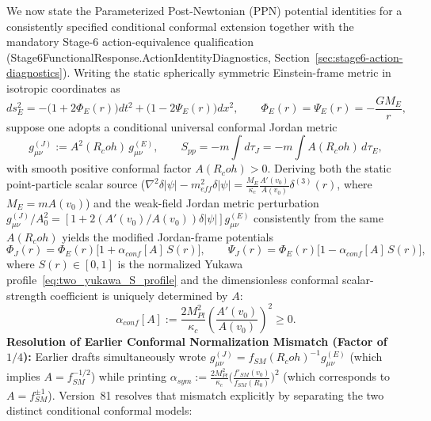 \documentclass[american,11pt,letterpaper]{article}
\newcommand{\Rcoh}{R_{\mathrm{coh}}}
\def\mathbf#1{#1}%
\def\mathrm#1{#1}%
\def\texttt#1{#1}%
\def\emph#1{#1}%
\def\Rcoh{R_coh}%
\begin{document}
We now state the Parameterized Post-Newtonian (PPN) potential identities for a \emph{consistently specified conditional conformal extension} together with the mandatory Stage-6 action-equivalence qualification (\texttt{Stage6FunctionalResponse.\allowbreak{}ActionIdentityDiagnostics}, Section~\ref{sec:stage6-action-diagnostics}). Writing the static spherically symmetric Einstein-frame metric in isotropic coordinates as
\[
ds_E^2 = -\bigl(1 + 2\Phi_E(r)\bigr)dt^2 + \bigl(1 - 2\Psi_E(r)\bigr)d\mathbf{x}^2,
\qquad
\Phi_E(r) = \Psi_E(r) = -\frac{G M_E}{r},
\]
suppose one adopts a conditional universal conformal Jordan metric
\begin{equation}
g_{\mu\nu}^{(J)} := A^2(\Rcoh)\,g_{\mu\nu}^{(E)},
\qquad
S_{\mathrm{pp}} = -m\int d\tau_J = -m\int A(\Rcoh)\,d\tau_E,
\label{eq:conformal_metric_general_A}
\end{equation}
with smooth positive conformal factor $A(\Rcoh) > 0$. Deriving \emph{both} the static point-particle scalar source ($\nabla^2\delta|\psi| - m_{\mathrm{eff}}^2\delta|\psi| = \frac{M_E}{\kappa_c}\frac{A'(v_0)}{A(v_0)}\delta^{(3)}(\mathbf{r})$, where $M_E = m A(v_0)$) \emph{and} the weak-field Jordan metric perturbation $g_{\mu\nu}^{(J)}/A_0^2 = [1 + 2(A'(v_0)/A(v_0))\delta|\psi|]g_{\mu\nu}^{(E)}$ consistently from the same $A(\Rcoh)$ yields the modified Jordan-frame potentials
\begin{equation}
\Phi_J(r) = \Phi_E(r)\bigl[1 + \alpha_{\mathrm{conf}}[A]\,S(r)\bigr],
\qquad
\Psi_J(r) = \Phi_E(r)\bigl[1 - \alpha_{\mathrm{conf}}[A]\,S(r)\bigr],
\label{eq:jordan_potentials_exact}
\end{equation}
where $S(r) \in [0,1]$ is the normalized Yukawa profile~\eqref{eq:two_yukawa_S_profile} and the dimensionless conformal scalar-strength coefficient is uniquely determined by $A$:
\begin{equation}
\alpha_{\mathrm{conf}}[A]
:= \frac{2 M_{\mathrm{Pl}}^2}{\kappa_c}\left(\frac{A'(v_0)}{A(v_0)}\right)^2 \ge 0.
\label{eq:alpha_conf_general}
\end{equation}
\textbf{Resolution of Earlier Conformal Normalization Mismatch (Factor of $1/4$):} Earlier drafts simultaneously wrote $g_{\mu\nu}^{(J)} = f_{\mathrm{SM}}(\Rcoh)^{-1} g_{\mu\nu}^{(E)}$ (which implies $A = f_{\mathrm{SM}}^{-1/2}$) while printing $\alpha_{\mathrm{sym}} := \frac{2 M_{\mathrm{Pl}}^2}{\kappa_c}\bigl(\frac{f'_{\mathrm{SM}}(v_0)}{f_{\mathrm{SM}}(R_0)}\bigr)^2$ (which corresponds to $A = f_{\mathrm{SM}}^{\pm 1}$). Version~81 resolves that mismatch explicitly by separating the two distinct conditional conformal models:
\end{document}
